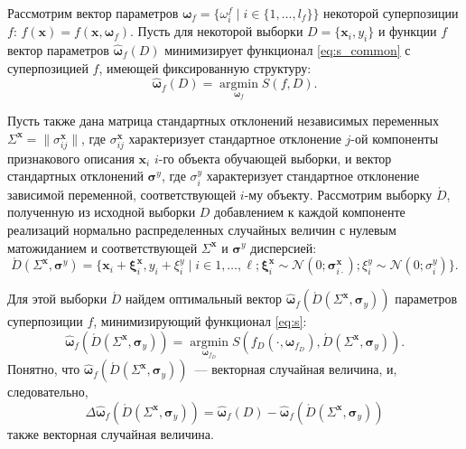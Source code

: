 \documentclass[11pt,a4paper]{article}
\theoremstyle{definition}
\begin{document}
Рассмотрим вектор параметров
$\boldsymbol{\omega}_f = \{ \omega_i^f \mid i \in \{ 1, \dots, l_f \} \}$
некоторой суперпозиции $f$: $f(\mathbf{x}) = f(\mathbf{x}, \boldsymbol{\omega}_f)$.
Пусть для некоторой выборки $D = \{ \mathbf{x}_i, y_i \}$ и функции
$f$ вектор параметров $\hat{\boldsymbol{\omega}}_f(D)$ минимизирует
функционал \eqref{eq:s_common} с суперпозицией $f$, имеющей фиксированную
структуру:
\[
  \hat{\boldsymbol{\omega}}_f(D) = \mathop{\arg \min}\limits_{\boldsymbol{\omega}_f} S(f, D).
\]

Пусть также дана матрица стандартных отклонений
независимых переменных $\Sigma^{\mathbf{x}} = \| \sigma^{\mathbf{x}}_{ij} \|$,
где $\sigma^{\mathbf{x}}_{ij}$ характеризует стандартное отклонение $j$-ой
компоненты признакового описания $\mathbf{x}_i$ $i$-го объекта обучающей выборки,
и вектор стандартных отклонений $\boldsymbol{\sigma}^y$, где $\sigma^y_i$
характеризует стандартное отклонение зависимой переменной, соответствующей
$i$-му объекту.
Рассмотрим выборку $\acute{D}$, полученную из исходной выборки $D$
добавлением к каждой компоненте реализаций нормально распределенных
случайных величин с нулевым матожиданием и соответствующей
$\Sigma^{\mathbf{x}}$ и $\boldsymbol{\sigma}^y$ дисперсией:
\begin{equation}
  \acute{D}(\Sigma^{\mathbf{x}}, \boldsymbol{\sigma}^y) = \{ \mathbf{x}_i + \boldsymbol{\xi}^{\mathbf{x}}_i, y_i + \xi^y_i \mid i \in 1, \dots, \ell; \boldsymbol{\xi}^{\mathbf{x}}_i \sim \mathcal{N}(0; \boldsymbol{\sigma}^{\mathbf{x}}_{i \cdot}); \xi^y_i \sim \mathcal{N}(0; \sigma^y_i) \}.
  \label{eq:d_acute}
\end{equation}

Для этой выборки $\acute{D}$ найдем оптимальный вектор $\hat{\boldsymbol{\omega}}_f (\acute{D} (\Sigma^{\mathbf{x}}, \boldsymbol{\sigma}_y))$
параметров суперпозиции $f$, минимизирующий функционал \eqref{eq:s}:
\begin{equation}
  \hat{\boldsymbol{\omega}}_f (\acute{D} (\Sigma^{\mathbf{x}}, \boldsymbol{\sigma}_y)) = \mathop{\arg \min}\limits_{\boldsymbol{\omega}_{f_D}} S (f_D (\cdot, \boldsymbol{\omega}_{f_D}), \acute{D} (\Sigma^{\mathbf{x}}, \boldsymbol{\sigma}_y)).
  \label{eq:hat_omega}
\end{equation}
Понятно, что $\hat{\boldsymbol{\omega}}_f (\acute{D} (\Sigma^{\mathbf{x}}, \boldsymbol{\sigma}_y))$~---
векторная случайная величина, и, следовательно,
\[
  \Delta\hat{\boldsymbol{\omega}}_f(\acute{D} (\Sigma^{\mathbf{x}}, \boldsymbol{\sigma}_y) ) = \hat{\boldsymbol{\omega}}_f(D) - \hat{\boldsymbol{\omega}}_f (\acute{D} (\Sigma^{\mathbf{x}}, \boldsymbol{\sigma}_y))
\]
также векторная случайная величина.
\end{document}
